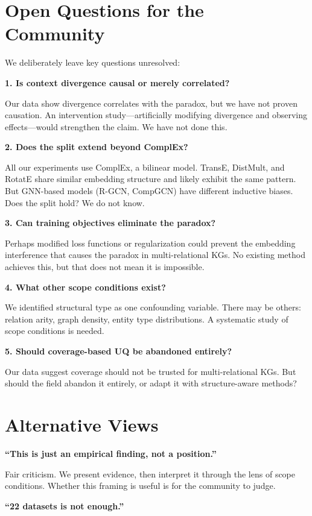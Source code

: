 \documentclass{article}
\begin{document}
\section{Open Questions for the Community}

We deliberately leave key questions unresolved:

\textbf{1. Is context divergence causal or merely correlated?}

Our data show divergence correlates with the paradox, but we have not proven causation. An intervention study---artificially modifying divergence and observing effects---would strengthen the claim. We have not done this.

\textbf{2. Does the split extend beyond ComplEx?}

All our experiments use ComplEx, a bilinear model. TransE, DistMult, and RotatE share similar embedding structure and likely exhibit the same pattern. But GNN-based models (R-GCN, CompGCN) have different inductive biases. Does the split hold? We do not know.

\textbf{3. Can training objectives eliminate the paradox?}

Perhaps modified loss functions or regularization could prevent the embedding interference that causes the paradox in multi-relational KGs. No existing method achieves this, but that does not mean it is impossible.

\textbf{4. What other scope conditions exist?}

We identified structural type as one confounding variable. There may be others: relation arity, graph density, entity type distributions. A systematic study of scope conditions is needed.

\textbf{5. Should coverage-based UQ be abandoned entirely?}

Our data suggest coverage should not be trusted for multi-relational KGs. But should the field abandon it entirely, or adapt it with structure-aware methods?

\section{Alternative Views}

\textbf{``This is just an empirical finding, not a position.''}

Fair criticism. We present evidence, then interpret it through the lens of scope conditions. Whether this framing is useful is for the community to judge.

\textbf{``22 datasets is not enough.''}
\end{document}

